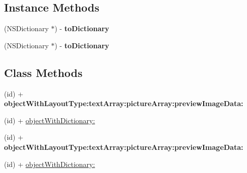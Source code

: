\subsection*{Instance Methods}
\begin{DoxyCompactItemize}
\item 
\mbox{\label{interface_q_q_api_common_content_object_abad097c9dc11656bae461ab4b48d1bf2}} 
(N\+S\+Dictionary $\ast$) -\/ {\bfseries to\+Dictionary}
\item 
\mbox{\label{interface_q_q_api_common_content_object_abad097c9dc11656bae461ab4b48d1bf2}} 
(N\+S\+Dictionary $\ast$) -\/ {\bfseries to\+Dictionary}
\end{DoxyCompactItemize}
\subsection*{Class Methods}
\begin{DoxyCompactItemize}
\item 
\mbox{\label{interface_q_q_api_common_content_object_a25d63a57adec8f590125f6762c6ff4de}} 
(id) + {\bfseries object\+With\+Layout\+Type\+:text\+Array\+:picture\+Array\+:preview\+Image\+Data\+:}
\item 
(id) + \mbox{\hyperlink{interface_q_q_api_common_content_object_a2a8eba5f3585d34a67267fc3890baeab}{object\+With\+Dictionary\+:}}
\item 
\mbox{\label{interface_q_q_api_common_content_object_a25d63a57adec8f590125f6762c6ff4de}} 
(id) + {\bfseries object\+With\+Layout\+Type\+:text\+Array\+:picture\+Array\+:preview\+Image\+Data\+:}
\item 
(id) + \mbox{\hyperlink{interface_q_q_api_common_content_object_a2a8eba5f3585d34a67267fc3890baeab}{object\+With\+Dictionary\+:}}
\end{DoxyCompactItemize}
